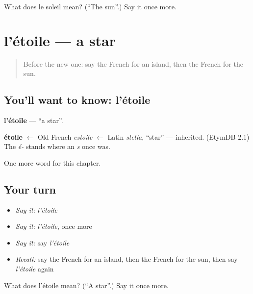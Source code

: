 \begin{tcolorbox}[breakable,colback=teal!4,colframe=teal!35!black,title={Before you move on}]
What does le soleil mean? (\textquotedblleft{}The sun\textquotedblright{}.) Say it once more.
\end{tcolorbox}
\section[l'étoile]{l'étoile — a star}

\label{lesson:FR-C83-etoile}



\begin{quote}
Before the new one: say the French for an island, then the French for the sun.
\end{quote}

\subsection*{You'll want to know: l'étoile}
\textbf{l'étoile} — \textquotedblleft{}a star\textquotedblright{}.

\begin{cousinweb}
\textbf{étoile} $\leftarrow$ Old French \emph{estoile} $\leftarrow$ Latin \emph{stella}, \textquotedblleft{}star\textquotedblright{} — inherited. (EtymDB 2.1) The \emph{é-} stands where an \emph{s} once was.
\end{cousinweb}

\begin{grammarlens}[title={What you've built}]
One more word for this chapter.
\end{grammarlens}

\subsection*{Your turn}
\begin{itemize}
\raggedright
  \item \emph{Say it:} \emph{l'étoile}
  \item \emph{Say it:} \emph{l'étoile}, once more
  \item \emph{Say it:} say \emph{l'étoile}
  \item \emph{Recall:} say the French for an island, then the French for the sun, then say \emph{l'étoile} again
\end{itemize}

\begin{tcolorbox}[breakable,colback=teal!4,colframe=teal!35!black,title={Before you move on}]
What does l'étoile mean? (\textquotedblleft{}A star\textquotedblright{}.) Say it once more.
\end{tcolorbox}
